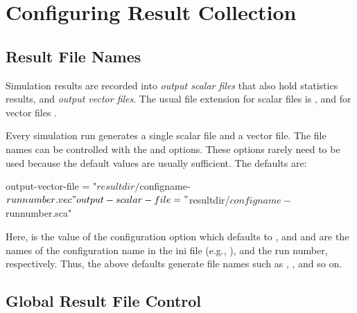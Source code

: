 \section{Configuring Result Collection}
\label{sec:ana-sim:config-results}

\subsection{Result File Names}
\label{sec:ana-sim:result-file-names}

Simulation results are recorded into \textit{output scalar files} that also hold
statistics results, and \textit{output vector files}. The usual file extension
for scalar files is , and for vector files .

Every simulation run generates a single scalar file and a vector file. The file
names can be controlled with the  and
 options. These options rarely need to be used
because the default values are usually sufficient. The defaults are:

\begin{inifile}
output-vector-file = "${resultdir}/${configname}-${runnumber}.vec"
output-scalar-file = "${resultdir}/${configname}-${runnumber}.sca"
\end{inifile}

Here,  is the value of the 
configuration option which defaults to , and
 and  are the names of the
configuration name in the ini file (e.g., ), and the run
number, respectively. Thus, the above defaults generate file names such as
, , and so on.



\subsection{Global Result File Control}
\label{sec:ana-sim:global-result-file-control}

